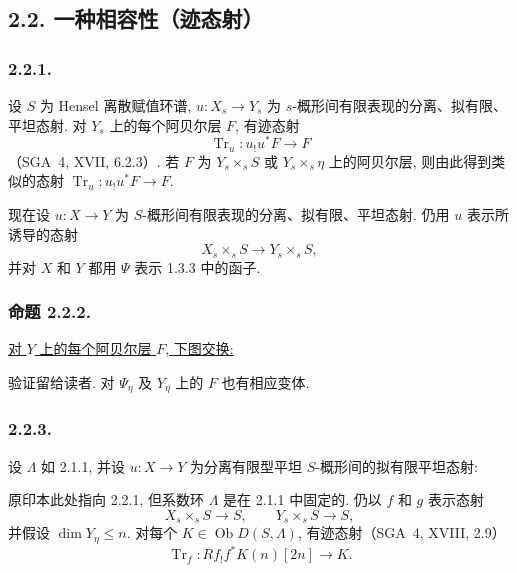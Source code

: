\subsection*{2.2. 一种相容性（迹态射）}

\subsubsection*{2.2.1.}
设 $S$ 为 Hensel 离散赋值环谱, $u:X_s\longrightarrow Y_s$ 为 $s$-概形间有限表现的分离、拟有限、平坦态射. 对 $Y_s$ 上的每个阿贝尔层 $F$, 有迹态射
\[
\operatorname{Tr}_u:u_!u^*F\longrightarrow F
\]
（SGA~4, XVII, 6.2.3）. 若 $F$ 为 $Y_s\times_sS$ 或 $Y_s\times_s\eta$ 上的阿贝尔层, 则由此得到类似的态射 $\operatorname{Tr}_u:u_!u^*F\longrightarrow F$.

现在设 $u:X\longrightarrow Y$ 为 $S$-概形间有限表现的分离、拟有限、平坦态射. 仍用 $u$ 表示所诱导的态射
\[
X_s\times_sS\longrightarrow Y_s\times_sS,
\]
并对 $X$ 和 $Y$ 都用 $\Psi$ 表示 1.3.3 中的函子.

\subsubsection*{命题 2.2.2.}
\underline{对 $Y$ 上的每个阿贝尔层 $F$, 下图交换:}
\begin{center}
\end{center}
验证留给读者. 对 $\Psi_\eta$ 及 $Y_\eta$ 上的 $F$ 也有相应变体.

\subsubsection*{2.2.3.}
设 $\Lambda$ 如 2.1.1, 并设 $u:X\longrightarrow Y$ 为分离有限型平坦 $S$-概形间的拟有限平坦态射:
\begin{center}
\end{center}
原印本此处指向 2.2.1, 但系数环 $\Lambda$ 是在 2.1.1 中固定的. 仍以 $f$ 和 $g$ 表示态射
\[
X_s\times_sS\longrightarrow S,
\qquad
Y_s\times_sS\longrightarrow S,
\]
并假设 $\dim Y_\eta\leq n$. 对每个 $K\in\operatorname{Ob}D(S,\Lambda)$, 有迹态射（SGA~4, XVIII, 2.9）
\[
\operatorname{Tr}_f:Rf_!f^*K(n)[2n]\longrightarrow K.
\]

